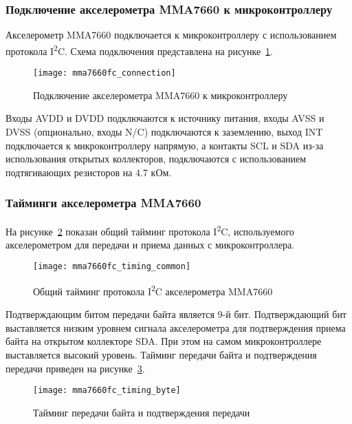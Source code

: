 \documentclass[document.tex]{subfiles}
\begin{document}
\clearpage
\subsubsection{Подключение акселерометра MMA7660 к микроконтроллеру}
Акселерометр MMA7660 подключается к микроконтроллеру с использова\-нием протокола I\textsuperscript{2}C. Схема подключения представлена на рисунке~\ref{fig:mma7660fc_connection}.

\begin{figure}[h]
\centering
\texttt{[image: mma7660fc\_connection]}
\caption{Подключение акселерометра MMA7660 к микроконтроллеру}
\label{fig:mma7660fc_connection}
\end{figure}

Входы AVDD и DVDD подключаются к источнику питания, входы AVSS и DVSS (опцио\-нально, входы N/C) подключаются к заземлению, выход INT подключается к микрокон\-троллеру
напрямую, а контакты SCL и SDA из-за использования открытых коллекторов, подключаются с использованием подтя\-гивающих резисторов на 4.7 кОм.\cite{accelerometer_mma7660, basics}

\clearpage
\subsubsection{Тайминги акселерометра MMA7660}
На рисунке~\ref{fig:mma7660fc_timing_common} показан общий тайминг протокола I\textsuperscript{2}C, используемого акселе\-рометром для передачи и приема данных с микроконтроллера.
\begin{figure}[h]
\centering
\texttt{[image: mma7660fc\_timing\_common]}
\caption{Общий тайминг протокола I\textsuperscript{2}C акселерометра MMA7660}
\label{fig:mma7660fc_timing_common}
\end{figure}

Подтверждающим битом передачи байта является 9-й бит. Подтверждающий бит выстав\-ляется низким уровнем сигнала акселерометра для подтверждения приема байта на открытом коллекторе
SDA. При этом на самом микроконтрол\-лере выставляется высокий уровень. Тайминг передачи байта и подтверждения передачи приведен на
рисунке~\ref{fig:mma7660fc_timing_byte}.\cite{accelerometer_mma7660}

\begin{figure}[h]
\centering
\texttt{[image: mma7660fc\_timing\_byte]}
\caption{Тайминг передачи байта и подтверждения передачи}
\label{fig:mma7660fc_timing_byte}
\end{figure}
\end{document}
